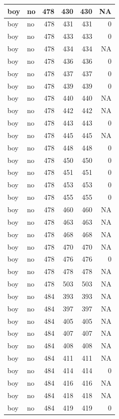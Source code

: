 \documentclass[man]{apa6}
\begin{document}
\begin{tabular}{l|l|r|r|r|r}
\hline
boy & no & 478 & 430 & 430 & NA\\
\hline
boy & no & 478 & 431 & 431 & 0\\
\hline
boy & no & 478 & 433 & 433 & 0\\
\hline
boy & no & 478 & 434 & 434 & NA\\
\hline
boy & no & 478 & 436 & 436 & 0\\
\hline
boy & no & 478 & 437 & 437 & 0\\
\hline
boy & no & 478 & 439 & 439 & 0\\
\hline
boy & no & 478 & 440 & 440 & NA\\
\hline
boy & no & 478 & 442 & 442 & NA\\
\hline
boy & no & 478 & 443 & 443 & 0\\
\hline
boy & no & 478 & 445 & 445 & NA\\
\hline
boy & no & 478 & 448 & 448 & 0\\
\hline
boy & no & 478 & 450 & 450 & 0\\
\hline
boy & no & 478 & 451 & 451 & 0\\
\hline
boy & no & 478 & 453 & 453 & 0\\
\hline
boy & no & 478 & 455 & 455 & 0\\
\hline
boy & no & 478 & 460 & 460 & NA\\
\hline
boy & no & 478 & 463 & 463 & NA\\
\hline
boy & no & 478 & 468 & 468 & NA\\
\hline
boy & no & 478 & 470 & 470 & NA\\
\hline
boy & no & 478 & 476 & 476 & 0\\
\hline
boy & no & 478 & 478 & 478 & NA\\
\hline
boy & no & 478 & 503 & 503 & NA\\
\hline
boy & no & 484 & 393 & 393 & NA\\
\hline
boy & no & 484 & 397 & 397 & NA\\
\hline
boy & no & 484 & 405 & 405 & NA\\
\hline
boy & no & 484 & 407 & 407 & NA\\
\hline
boy & no & 484 & 408 & 408 & NA\\
\hline
boy & no & 484 & 411 & 411 & NA\\
\hline
boy & no & 484 & 414 & 414 & 0\\
\hline
boy & no & 484 & 416 & 416 & NA\\
\hline
boy & no & 484 & 418 & 418 & NA\\
\hline
boy & no & 484 & 419 & 419 & 0\\

\end{tabular}
\end{document}
